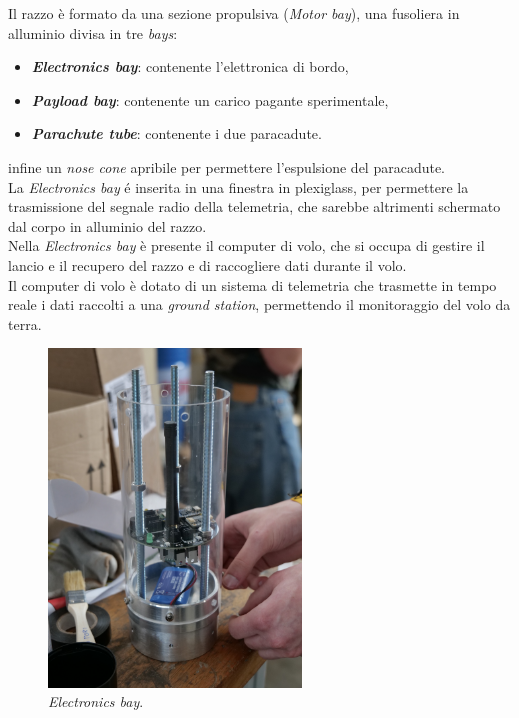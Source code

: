 \documentclass[12pt,a4paper,twoside]{book}
\begin{document}
Il razzo è formato da una sezione propulsiva (\emph{Motor bay}), una fusoliera
in alluminio divisa in tre \emph{bays}:
\begin{itemize}
    \item \textbf{\emph{Electronics bay}}: contenente l'elettronica di bordo,
    \item \textbf{\emph{Payload bay}}: contenente un carico pagante sperimentale,
    \item \textbf{\emph{Parachute tube}}: contenente i due paracadute.
\end{itemize}
infine un \emph{nose cone} apribile per permettere l'espulsione del paracadute. \\

La \emph{Electronics bay} \'e inserita in una finestra in plexiglass, per permettere 
la trasmissione del segnale radio della telemetria, che sarebbe altrimenti schermato 
dal corpo in alluminio del razzo. \\

Nella \emph{Electronics bay}
è presente il computer di volo, che si occupa di
gestire il lancio e il recupero del razzo e di raccogliere dati durante il volo. \\
Il computer di volo è dotato di un sistema di telemetria che trasmette in tempo
reale i dati raccolti a una \emph{ground station}, permettendo il monitoraggio
del volo da terra.

\begin{figure}[H]
    \centering
    \includegraphics[width=0.6\textwidth]{img/electronics-bay.jpg}
    \caption{\emph{Electronics bay}.}
    \label{fig:electronics-bay}
\end{figure}
\end{document}
